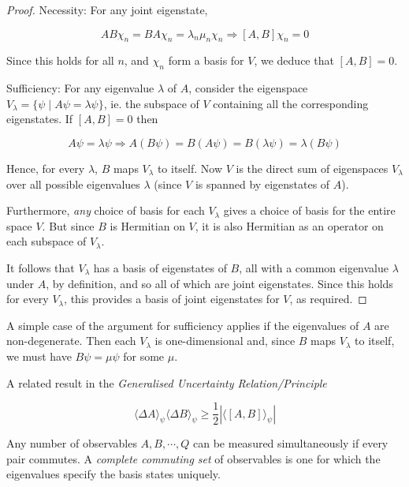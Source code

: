 \documentclass[a4paper]{article}
\begin{document}
\begin{proof}
	Necessity: For any joint eigenstate,
	
	\[ AB \chi_{n} = B A \chi_{n} = \lambda_{n} \mu_{n} \chi_{n} \Rightarrow [A,B] \chi_{n} = 0 \]
	
	Since this holds for all $ n $, and $ \chi_{n} $ form a basis for $ V $, we deduce that $ [A,B] = 0 $.
	
	Sufficiency: For any eigenvalue $ \lambda $ of $ A $, consider the eigenspace $ V_{\lambda} = \{  \psi \; | \; A \psi = \lambda \psi   \} $, ie. the subspace of $ V $ containing all the corresponding eigenstates. If $ [A,B] = 0 $ then
	
	\[ A \psi = \lambda \psi \Rightarrow A (B \psi) = B (A \psi) = B (\lambda \psi) = \lambda(B \psi) \]
	
	Hence, for every $ \lambda $, $ B $ maps $ V_{\lambda} $ to itself. Now $ V $ is the direct sum of eigenspaces $ V_{\lambda} $ over all possible eigenvalues $ \lambda $ (since $ V $ is spanned by eigenstates of $ A $).
	
	Furthermore, \emph{any} choice of basis for each $ V_{\lambda} $ gives a choice of basis for the entire space $ V $. But since $ B $ is Hermitian on $ V $, it is also Hermitian as an operator on each subspace of $ V_{\lambda} $. 
	
	It follows that $ V_{\lambda} $ has a basis of eigenstates of $ B $, all with a common eigenvalue $ \lambda $ under $ A $, by definition, and so all of which are joint eigenstates. Since this holds for every $ V_{\lambda} $, this provides a basis of joint eigenstates for $ V $, as required. 
	
\end{proof}

	A simple case of the argument for sufficiency applies if the eigenvalues of $ A $ are non-degenerate. Then each $ V_{\lambda} $ is one-dimensional and, since $ B $ maps $ V_{\lambda} $ to itself, we must have $ B \psi = \mu \psi $ for some $ \mu $.


A related result in the \emph{Generalised Uncertainty Relation/Principle} 

\[ \langle \Delta A \rangle_{\psi} \langle \Delta B \rangle_{\psi}  \geq \frac{1}{2} |  \langle [A,B] \rangle_{\psi}  |   \]

Any number of observables $ A,B,\cdots,Q $ can be measured simultaneously if every pair commutes. A \emph{complete commuting set} of observables is one for which the eigenvalues specify the basis states uniquely.
\end{document}
